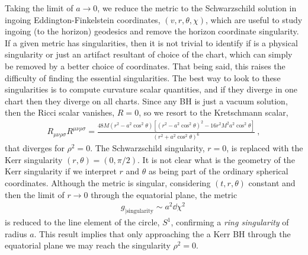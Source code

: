 Taking the limit of $a\to0$, we reduce the metric to the Schwarzschild solution in ingoing Eddington-Finkelstein coordinates, $(v,r,\theta,\chi)$, which are useful to study ingoing (to the horizon) geodesics and remove the horizon coordinate singularity.
If a given metric has singularities, then it is not trivial to identify if is a physical singularity or just an artifact resultant of choice of the chart, which can simply be removed by a better choice of coordinates. 
That being said, this raises the difficulty of finding the essential singularities.
The best way to look to these singularities is to compute curvature scalar quantities, and if they diverge in one chart then they diverge on all charts.
Since any BH is just a vacuum solution, then the Ricci scalar vanishes, $R=0$, so we resort to the Kretschmann scalar,
\begin{align}
    R_{\mu\nu\rho\sigma} R^{\mu\nu\rho\sigma} = \frac{48 M (r^2 - a^2\cos^2\theta) \left[ (r^2 - a^2\cos^2\theta) ^2 - 16 r^2 M^2 a^2\cos^2\theta \right] }{(r^2 + a^2\cos^2\theta)^6} ~,
    \label{eq2:KerrKretschmann}
\end{align}
that diverges for $\rho^2=0$.
The Schwarzschild singularity, $r=0$, is replaced with the Kerr singularity $(r,\theta)=(0,\pi/2)$.
It is not clear what is the geometry of the Kerr singularity if we interpret $r$ and $\theta$ as being part of the ordinary spherical coordinates.
Although the metric is singular, considering $(t,r,\theta)$ constant and then the limit of $r\to0$ through the equatorial plane, the metric
\begin{align}
    g_{\rvert\mathrm{singularity}} \sim a^2 \dd \chi^2 ~
    \label{eq2:KerrKretschmann}
\end{align}
is reduced to the line element of the circle, $S^1$, confirming a \emph{ring singularity} of radius $a$.
This result implies that only approaching the a Kerr BH through the equatorial plane we may reach the singularity $\rho^2=0$. 

